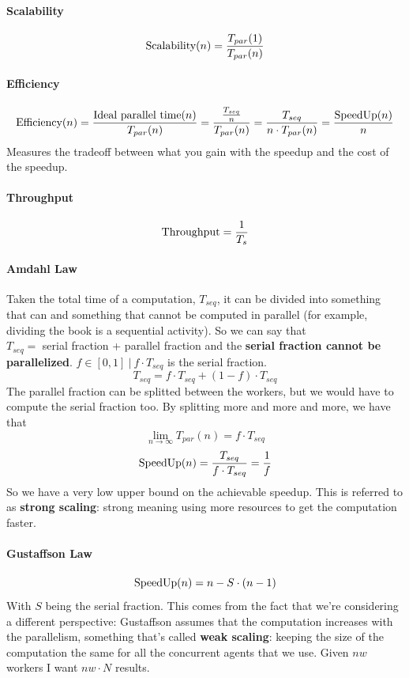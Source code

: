 \documentclass[10pt]{report}
\begin{document}
\paragraph{Scalability} $$\hbox{Scalability}(n)=\frac{T_{par}(1)}{T_{par}(n)}$$
\paragraph{Efficiency} $$\hbox{Efficiency}(n) = \frac{\hbox{Ideal parallel time}(n)}{T_{par}(n)} = \frac{\frac{T_{seq}}{n}}{T_{par}(n)} = \frac{T_{seq}}{n\cdot T_{par}(n)} = \frac{\hbox{SpeedUp}(n)}{n}$$
Measures the tradeoff between what you gain with the speedup and the cost of the speedup.
\paragraph{Throughput} $$\hbox{Throughput} = \frac{1}{T_s}$$
\paragraph{Amdahl Law} Taken the total time of a computation, $T_{seq}$, it can be divided into something that can and something that cannot be computed in parallel (for example, dividing the book is a sequential activity). So we can say that\\$T_{seq} =$ serial fraction + parallel fraction and the \textbf{serial fraction cannot be parallelized}. $f\in[0,1]\:|\:f\cdot T_{seq}$ is the serial fraction.
$$T_{seq} = f\cdot T_{seq} + (1-f)\cdot T_{seq}$$
The parallel fraction can be splitted between the workers, but we would have to compute the serial fraction too. By splitting more and more and more, we have that $$\lim_{n\to\infty} T_{par}(n) = f\cdot T_{seq}$$ $$\hbox{SpeedUp}(n) = \frac{T_{seq}}{f\cdot T_{seq}} = \frac{1}{f}$$
So we have a very low upper bound on the achievable speedup. This is referred to as \textbf{strong scaling}: strong meaning using more resources to get the computation faster.
\paragraph{Gustaffson Law} $$\hbox{SpeedUp}(n) = n - S\cdot(n-1)$$ With $S$ being the serial fraction. This comes from the fact that we're considering a different perspective: Gustaffson assumes that the computation increases with the parallelism, something that's called \textbf{weak scaling}: keeping the size of the computation the same for all the concurrent agents that we use. Given $nw$ workers I want $nw\cdot N$ results.
\end{document}
